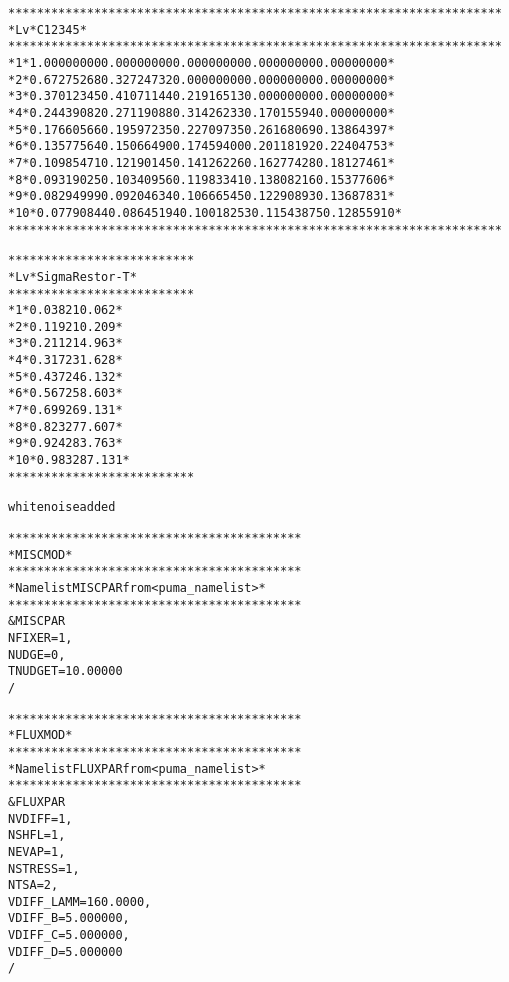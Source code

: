 \begin{alltt}
 *********************************************************************
 * Lv * C          1           2           3           4           5 *
 *********************************************************************
 *  1 *   1.00000000  0.00000000  0.00000000  0.00000000  0.00000000 *
 *  2 *   0.67275268  0.32724732  0.00000000  0.00000000  0.00000000 *
 *  3 *   0.37012345  0.41071144  0.21916513  0.00000000  0.00000000 *
 *  4 *   0.24439082  0.27119088  0.31426233  0.17015594  0.00000000 *
 *  5 *   0.17660566  0.19597235  0.22709735  0.26168069  0.13864397 *
 *  6 *   0.13577564  0.15066490  0.17459400  0.20118192  0.22404753 *
 *  7 *   0.10985471  0.12190145  0.14126226  0.16277428  0.18127461 *
 *  8 *   0.09319025  0.10340956  0.11983341  0.13808216  0.15377606 *
 *  9 *   0.08294999  0.09204634  0.10666545  0.12290893  0.13687831 *
 * 10 *   0.07790844  0.08645194  0.10018253  0.11543875  0.12855910 *
 *********************************************************************

 **************************
 * Lv *    Sigma Restor-T *
 **************************
 *  1 *    0.038  210.062 *
 *  2 *    0.119  210.209 *
 *  3 *    0.211  214.963 *
 *  4 *    0.317  231.628 *
 *  5 *    0.437  246.132 *
 *  6 *    0.567  258.603 *
 *  7 *    0.699  269.131 *
 *  8 *    0.823  277.607 *
 *  9 *    0.924  283.763 *
 * 10 *    0.983  287.131 *
 **************************

 white noise added

 *****************************************
 * MISCMOD                               *
 *****************************************
 * Namelist MISCPAR from <puma_namelist> *
 *****************************************
 &MISCPAR
 NFIXER  =           1,
 NUDGE   =           0,
 TNUDGET =   10.00000    
 /

 *****************************************
 * FLUXMOD                               *
 *****************************************
 * Namelist FLUXPAR from <puma_namelist> *
 *****************************************
 &FLUXPAR
 NVDIFF  =           1,
 NSHFL   =           1,
 NEVAP   =           1,
 NSTRESS =           1,
 NTSA    =           2,
 VDIFF_LAMM      =   160.0000    ,
 VDIFF_B =   5.000000    ,
 VDIFF_C =   5.000000    ,
 VDIFF_D =   5.000000    
 /


\end{alltt}
